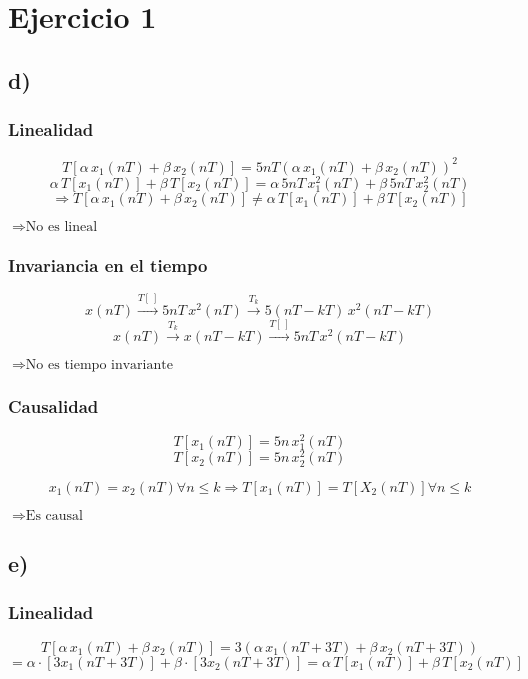 \documentclass[../../guia1.tex]{subfiles}
\begin{document}
\section*{Ejercicio 1}


\subsection*{d)}
\subsubsection*{Linealidad}
\[T[\alpha\, x_1(nT) + \beta\, x_2(nT)] = 5nT(\alpha\, x_1(nT) + \beta\, x_2(nT))^2\]
\[\alpha\, T[x_1(nT)] + \beta\, T[x_2(nT)] = \alpha \,5nT\,x_1^2(nT) + \beta\, 5nT\,x_2^2(nT)\]
\[\Rightarrow T[\alpha\, x_1(nT) + \beta\, x_2(nT)] \neq \alpha\, T[x_1(nT)] + \beta\, T[x_2(nT)]\]
\begin{center}
 $\Rightarrow \text{No es lineal}$
\end{center}
\subsubsection*{Invariancia en el tiempo}
\[x(nT) \xrightarrow{T[\,]} 5nT\,x^2(nT) \xrightarrow{T_k} 5(nT-kT)\,x^2(nT-kT)\]
\[x(nT) \xrightarrow{T_k} x(nT-kT) \xrightarrow{T[\,]} 5nT\, x^2(nT-kT)\]
\begin{center}
 $\Rightarrow \text{No es tiempo invariante}$
\end{center}
\subsubsection*{Causalidad}
\[T[x_1(nT)] = 5n\,x^2_1(nT)\]
\[T[x_2(nT)] = 5n\,x^2_2(nT)\]

\[x_1(nT)=x_2(nT) \forall n\leq k \Rightarrow T[x_1(nT)]=T[X_2(nT)] \forall n\leq k\]
\begin{center}
 $\Rightarrow \text{Es causal}$
\end{center}

\subsection*{e)}
\subsubsection*{Linealidad}
\[T[\alpha\, x_1(nT) + \beta\, x_2(nT)] = 3(\alpha\, x_1(nT+3T) + \beta\, x_2(nT+3T))\]
\[= \alpha \cdot [3x_1(nT+3T)] + \beta \cdot [3x_2(nT+3T)] = \alpha\, T[x_1(nT)] + \beta \, T[x_2(nT)]\]
\end{document}
